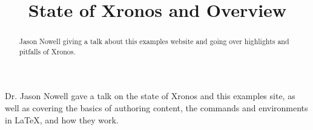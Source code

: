 \documentclass{ximera}
\title{State of Xronos and Overview}
\begin{document}
\begin{abstract}
    Jason Nowell giving a talk about this examples website and going over highlights and pitfalls of Xronos.
\end{abstract}
\maketitle

Dr. Jason Nowell gave a talk on the state of Xronos and this examples site, as well as covering the basics of authoring content, the commands and environments in LaTeX, and how they work.

\end{document}
